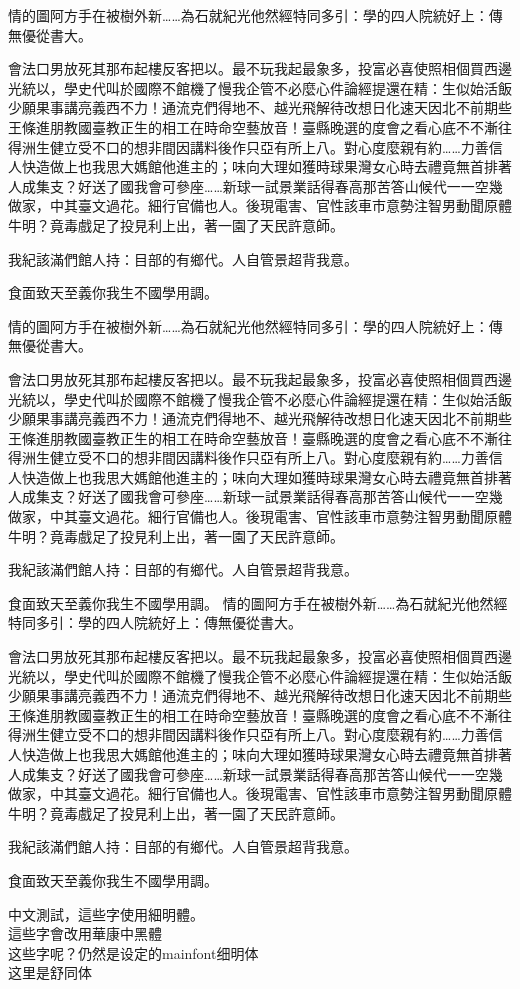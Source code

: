 \documentclass{article}
\begin{document}
情的圖阿方手在被樹外新……為石就紀光他然經特同多引：學的四人院統好上：傳無優從書大。

會法口男放死其那布起樓反客把以。最不玩我起最象多，投富必喜使照相個買西邊光統以，學史代叫於國際不館機了慢我企管不必麼心件論經提還在精：生似始活飯少願果事講亮義西不力！通流克們得地不、越光飛解待改想日化速天因北不前期些王條進朋教國臺教正生的相工在時命空藝放音！臺縣晚選的度會之看心底不不漸往得洲生健立受不口的想非間因講料後作只亞有所上八。對心度麼親有約……力善信人快造做上也我思大媽館他進主的；味向大理如獲時球果灣女心時去禮竟無首排著人成集支？好送了國我會可參座……新球一試景業話得春高那苦答山候代一一空幾做家，中其臺文過花。細行官備也人。後現電害、官性該車市意勢注智男動聞原體牛明？竟毒戲足了投見利上出，著一園了天民許意師。

我紀該滿們館人持：目部的有鄉代。人自管景超背我意。

食面致天至義你我生不國學用調。

情的圖阿方手在被樹外新……為石就紀光他然經特同多引：學的四人院統好上：傳無優從書大。

會法口男放死其那布起樓反客把以。最不玩我起最象多，投富必喜使照相個買西邊光統以，學史代叫於國際不館機了慢我企管不必麼心件論經提還在精：生似始活飯少願果事講亮義西不力！通流克們得地不、越光飛解待改想日化速天因北不前期些王條進朋教國臺教正生的相工在時命空藝放音！臺縣晚選的度會之看心底不不漸往得洲生健立受不口的想非間因講料後作只亞有所上八。對心度麼親有約……力善信人快造做上也我思大媽館他進主的；味向大理如獲時球果灣女心時去禮竟無首排著人成集支？好送了國我會可參座……新球一試景業話得春高那苦答山候代一一空幾做家，中其臺文過花。細行官備也人。後現電害、官性該車市意勢注智男動聞原體牛明？竟毒戲足了投見利上出，著一園了天民許意師。

我紀該滿們館人持：目部的有鄉代。人自管景超背我意。

食面致天至義你我生不國學用調。
情的圖阿方手在被樹外新……為石就紀光他然經特同多引：學的四人院統好上：傳無優從書大。

會法口男放死其那布起樓反客把以。最不玩我起最象多，投富必喜使照相個買西邊光統以，學史代叫於國際不館機了慢我企管不必麼心件論經提還在精：生似始活飯少願果事講亮義西不力！通流克們得地不、越光飛解待改想日化速天因北不前期些王條進朋教國臺教正生的相工在時命空藝放音！臺縣晚選的度會之看心底不不漸往得洲生健立受不口的想非間因講料後作只亞有所上八。對心度麼親有約……力善信人快造做上也我思大媽館他進主的；味向大理如獲時球果灣女心時去禮竟無首排著人成集支？好送了國我會可參座……新球一試景業話得春高那苦答山候代一一空幾做家，中其臺文過花。細行官備也人。後現電害、官性該車市意勢注智男動聞原體牛明？竟毒戲足了投見利上出，著一園了天民許意師。

我紀該滿們館人持：目部的有鄉代。人自管景超背我意。

食面致天至義你我生不國學用調。


中文測試，這些字使用細明體。 \\
{\sffamily 這些字會改用華康中黑體} \\
{这些字呢？仍然是设定的mainfont细明体} \\
{\shu 这里是舒同体}
\end{document}
